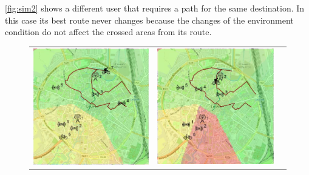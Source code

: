 \noindent \autoref{fig:sim2} shows a different user that requires a path for the same destination. In this case its best route never changes because the changes of the environment condition do not affect the crossed areas from its route.
% 
\begin{figure}[h]
    \centering
    \begin{tabular}{lll}
         \includegraphics[scale=0.42]{figures/sim2snap1.png}  &
         \includegraphics[scale=0.42]{figures/sim2snap2.png} &

\end{tabular}
\end{figure}
